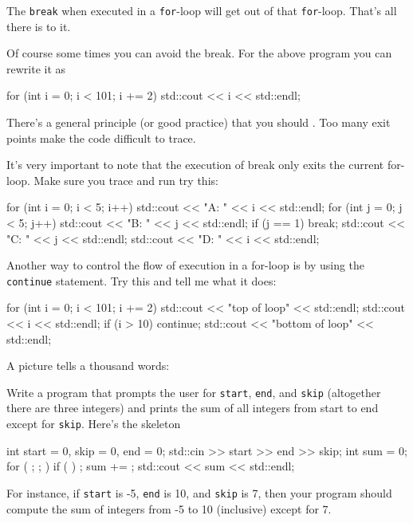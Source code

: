 \begin{console}
The \texttt{break} when executed in a \texttt{for}-loop will get out of that \texttt{for}-loop. That's all there is to it.

Of course some times you can avoid the break. For the above program you
can rewrite it as
\begin{console}
for (int i = 0; i < 101; i += 2)
{   
    std::cout << i << std::endl;
}
\end{console}
There's a general principle (or good practice) that you
should . Too
many exit points make the code difficult to trace.


It's very important to note that the execution of break
only exits the current for-loop. Make sure you trace and run try this:
\begin{console}
for (int i = 0; i < 5; i++)
{   
    std::cout << "A: " << i << std::endl;
    for (int j = 0; j < 5; j++)
    {   
        std::cout << "B: " << j << std::endl;
        if (j == 1) break;
        std::cout << "C: " << j << std::endl;
    }
    std::cout << "D: " << i << std::endl;
}

\newpage{}

Another way to control the flow of execution in a for-loop is by using
the \texttt{continue} statement. Try this and tell me what it does:
\begin{console}
for (int i = 0; i < 101; i += 2)
{   
    std::cout << "top of loop" << std::endl;
    std::cout << i << std::endl;
    if (i > 10) continue;
    std::cout << "bottom of loop" << std::endl;
}
\end{console}
A picture tells a thousand words:

\begin{ex}
Write a program that prompts the user for \texttt{start}, \texttt{end}, and \texttt{skip} (altogether there are three integers) and prints the sum of all integers from start to end except for \texttt{skip}. Here's the skeleton
\begin{console}
int start = 0, skip = 0, end = 0;
std::cin >> start >> end >> skip;
int sum = 0;
for (         ;          ;          )
{   
    if (          )          ;
    sum +=          ;
}
std::cout << sum << std::endl;
\end{console}
For instance, if \texttt{start} is -5, \texttt{end} is 10, and \texttt{skip}
is 7, then your program should compute the sum of integers from -5 to 10
(inclusive) except for 7.
\end{ex}


\end{console}
\end{console}
